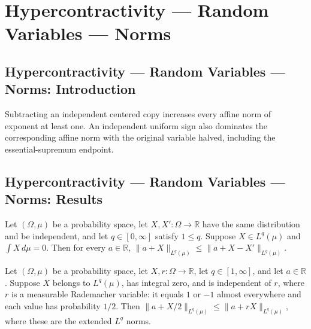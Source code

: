 \section{Hypercontractivity --- Random Variables --- Norms}
\subsection*{Hypercontractivity --- Random Variables --- Norms: Introduction}
Subtracting an independent centered copy increases every affine norm of exponent at least one. An independent uniform sign also dominates the corresponding affine norm with the original variable halved, including the essential-supremum endpoint.

\subsection*{Hypercontractivity --- Random Variables --- Norms: Results}

\begin{theorem}
\leanok
{}
Let $(\Omega,\mu)$ be a probability space, let $X,X':\Omega\to\mathbb R$ have the same
distribution and be independent, and let $q\in[0,\infty]$ satisfy $1\le q$. Suppose
$X\in L^q(\mu)$ and $\int X\,d\mu=0$. Then for every $a\in\mathbb R$,
$\|a+X\|_{L^q(\mu)}\le\|a+X-X'\|_{L^q(\mu)}$.
\end{theorem}

\begin{theorem}
\leanok
{}
Let $(\Omega,\mu)$ be a probability space, let $X,r:\Omega\to\mathbb R$, let
$q\in[1,\infty]$, and let $a\in\mathbb R$. Suppose $X$ belongs to $L^q(\mu)$, has
integral zero, and is independent of $r$, where $r$ is a measurable Rademacher variable:
it equals $1$ or $-1$ almost everywhere and each value has probability $1/2$. Then
$\|a+X/2\|_{L^q(\mu)}\le\|a+rX\|_{L^q(\mu)}$, where these are the extended $L^q$ norms.
\end{theorem}
